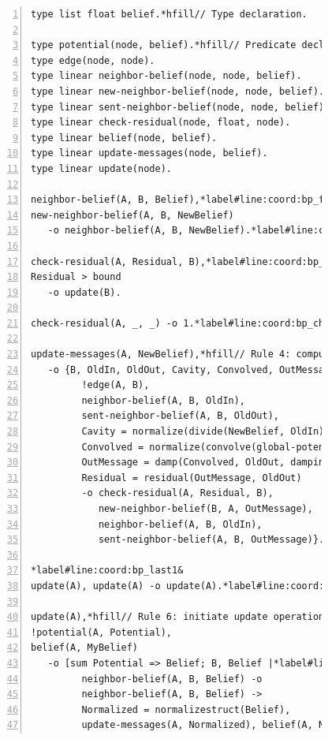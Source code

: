 \begin{figure}[ht]
\begin{Verbatim}[numbers=left, fontsize=\codesize, commandchars=\*\#\&]
type list float belief.*hfill// Type declaration.

type potential(node, belief).*hfill// Predicate declaration
type edge(node, node).
type linear neighbor-belief(node, node, belief).
type linear new-neighbor-belief(node, node, belief).
type linear sent-neighbor-belief(node, node, belief).
type linear check-residual(node, float, node).
type linear belief(node, belief).
type linear update-messages(node, belief).
type linear update(node).

neighbor-belief(A, B, Belief),*label#line:coord:bp_first1&*hfill// Rule 1: update neighbor belief value
new-neighbor-belief(A, B, NewBelief)
   -o neighbor-belief(A, B, NewBelief).*label#line:coord:bp_first2&

check-residual(A, Residual, B),*label#line:coord:bp_check1&*hfill// Rule 2: check residual
Residual > bound
   -o update(B).

check-residual(A, _, _) -o 1.*label#line:coord:bp_check2&*hfill// Rule 3: check residual

update-messages(A, NewBelief),*hfill// Rule 4: compute belief to be sent to a neighbor node*label#line:coord:bp_iterate1&
   -o {B, OldIn, OldOut, Cavity, Convolved, OutMessage, Residual |
         !edge(A, B),
         neighbor-belief(A, B, OldIn),
         sent-neighbor-belief(A, B, OldOut),
         Cavity = normalize(divide(NewBelief, OldIn)),
         Convolved = normalize(convolve(global-potential, Cavity)),
         OutMessage = damp(Convolved, OldOut, damping)
         Residual = residual(OutMessage, OldOut)
         -o check-residual(A, Residual, B),
            new-neighbor-belief(B, A, OutMessage),
            neighbor-belief(A, B, OldIn),
            sent-neighbor-belief(A, B, OutMessage)}.*label#line:coord:bp_iterate2&

*label#line:coord:bp_last1&
update(A), update(A) -o update(A).*label#line:coord:bp_update&*hfill// Rule 5: prune redundant update operations

update(A),*hfill// Rule 6: initiate update operation*label#line:coord:bp_update1&
!potential(A, Potential),
belief(A, MyBelief)
   -o [sum Potential => Belief; B, Belief |*label#line:coord:bp_agg1&
         neighbor-belief(A, B, Belief) -o
         neighbor-belief(A, B, Belief) ->
         Normalized = normalizestruct(Belief),
         update-messages(A, Normalized), belief(A, Normalized)].*label#line:coord:bp_last2&*label#line:coord:bp_update2&*label#line:coord:bp_agg2&
\end{Verbatim}


\label{code:coordination:bp}
\end{figure}


